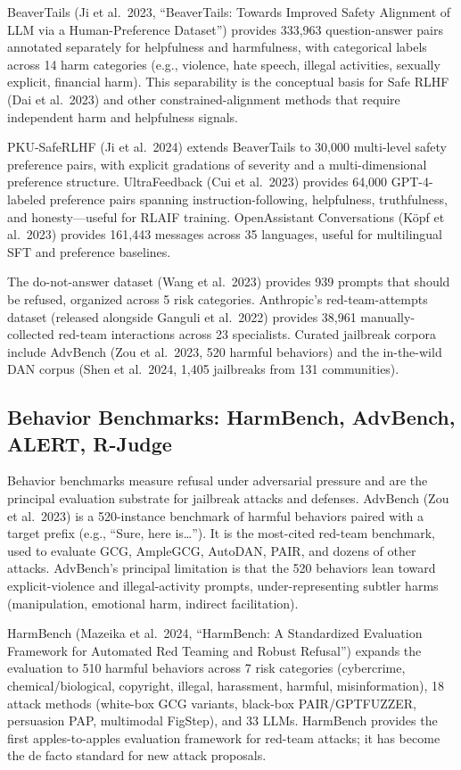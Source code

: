 \documentclass{article}
\begin{document}
BeaverTails (Ji et al.~2023, ``BeaverTails: Towards Improved Safety Alignment of LLM via a Human-Preference Dataset'') provides 333,963 question-answer pairs annotated separately for helpfulness and harmfulness, with categorical labels across 14 harm categories (e.g., violence, hate speech, illegal activities, sexually explicit, financial harm). This separability is the conceptual basis for Safe RLHF (Dai et al.~2023) and other constrained-alignment methods that require independent harm and helpfulness signals.

PKU-SafeRLHF (Ji et al.~2024) extends BeaverTails to 30,000 multi-level safety preference pairs, with explicit gradations of severity and a multi-dimensional preference structure. UltraFeedback (Cui et al.~2023) provides 64,000 GPT-4-labeled preference pairs spanning instruction-following, helpfulness, truthfulness, and honesty---useful for RLAIF training. OpenAssistant Conversations (Köpf et al.~2023) provides 161,443 messages across 35 languages, useful for multilingual SFT and preference baselines.

The do-not-answer dataset (Wang et al.~2023) provides 939 prompts that should be refused, organized across 5 risk categories. Anthropic's red-team-attempts dataset (released alongside Ganguli et al.~2022) provides 38,961 manually-collected red-team interactions across 23 specialists. Curated jailbreak corpora include AdvBench (Zou et al.~2023, 520 harmful behaviors) and the in-the-wild DAN corpus (Shen et al.~2024, 1,405 jailbreaks from 131 communities).

\subsection{Behavior Benchmarks: HarmBench, AdvBench, ALERT, R-Judge}\label{behavior-benchmarks-harmbench-advbench-alert-r-judge}

Behavior benchmarks measure refusal under adversarial pressure and are the principal evaluation substrate for jailbreak attacks and defenses. AdvBench (Zou et al.~2023) is a 520-instance benchmark of harmful behaviors paired with a target prefix (e.g., ``Sure, here is\ldots{}''). It is the most-cited red-team benchmark, used to evaluate GCG, AmpleGCG, AutoDAN, PAIR, and dozens of other attacks. AdvBench's principal limitation is that the 520 behaviors lean toward explicit-violence and illegal-activity prompts, under-representing subtler harms (manipulation, emotional harm, indirect facilitation).

HarmBench (Mazeika et al.~2024, ``HarmBench: A Standardized Evaluation Framework for Automated Red Teaming and Robust Refusal'') expands the evaluation to 510 harmful behaviors across 7 risk categories (cybercrime, chemical/biological, copyright, illegal, harassment, harmful, misinformation), 18 attack methods (white-box GCG variants, black-box PAIR/GPTFUZZER, persuasion PAP, multimodal FigStep), and 33 LLMs. HarmBench provides the first apples-to-apples evaluation framework for red-team attacks; it has become the de facto standard for new attack proposals.
\end{document}
